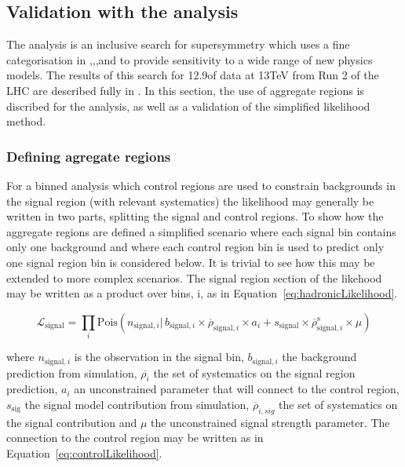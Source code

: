 \subsection{Validation with the \alphat analysis}
The \alphat analysis is an inclusive search for supersymmetry which
uses a fine categorisation in \nj,\nb,\scalht,and \mht to provide
sensitivity to a wide range of new physics models. The results 
of this search for 12.9\fb of data at 13TeV from Run 2 of the LHC
are described fully in \cite{CMS-PAS-SUS-16-016}. In this section,
the use of aggregate regions is discribed for the \alphat analysis, as well as a 
validation of the simplified likelihood method.

\subsubsection{Defining agregate regions}

For a binned analysis which control regions are used to constrain backgrounds in the signal region
(with relevant systematics) the likelihood may generally be written in two parts, splitting the signal
and control regions. To show how the aggregate regions are defined a simplified scenario 
where each signal bin contains only one background and where each control region bin is used to
predict only one signal region bin is considered below. It is trivial to see how this may
be extended to more complex scenarios. The signal region section of the likehood may be written
as a product over bins, i, as in Equation~\ref{eq:hadronicLikelihood}.

\begin{equation}
\mathcal{L}_{\mathrm{signal}}=\prod_i{\mathrm{Pois}(n_{\mathrm{signal},i} |\, b_{\mathrm{signal},i}
\times\overline{\rho}_{\mathrm{signal},i}\times{a_i} + s_{\mathrm{signal}}\times\overline{\rho}^\mathrm{s}_{\mathrm{signal},i}\times\mu)}
\label{eq:hadronicLikelihood}
\end{equation}

where $n_{\mathrm{signal},i}$ is the observation in the signal bin, $b_{\mathrm{signal},i}$
the background prediction from simulation, $\overline{\rho_{i}}$ the set of systematics
on the signal region prediction, ${a_i}$ an unconstrained parameter that will connect to the 
control region, $s_{\mathrm{sig}}$ the signal model contribution from simulation, 
$\overline{\rho}_{i,sig}$ the set of systematics on the signal contribution and $\mu$ the
unconstrained signal strength parameter.  The connection to the control region 
may be written as in Equation~\ref{eq:controlLikelihood}.

